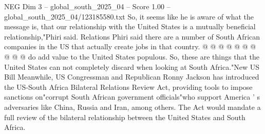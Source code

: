 \begin{textsample}{NEG Dim 3 – global\_south\_2025\_04 – Score 1.00 – global\_south\_2025\_04/123185580.txt}
So, it seems like he is aware of what the message is, that our relationship with the United States is a mutually beneficial relationship,"Phiri said.
Relations Phiri said there are a number of South African companies in the US that actually create jobs in that country. @ @ @ @ @ @ @ @ @ @ do add value to the United States populous.
So, these are things that the United States can not completely discard when looking at South Africa."New US Bill Meanwhile, US Congressman and Republican Ronny Jackson has introduced the US-South Africa Bilateral Relations Review Act, providing tools to impose sanctions on"corrupt South African government officials"who support America ' s adversaries like China, Russia and Iran, among others.
The Act would mandate a full review of the bilateral relationship between the United States and South Africa.

\end{textsample}
